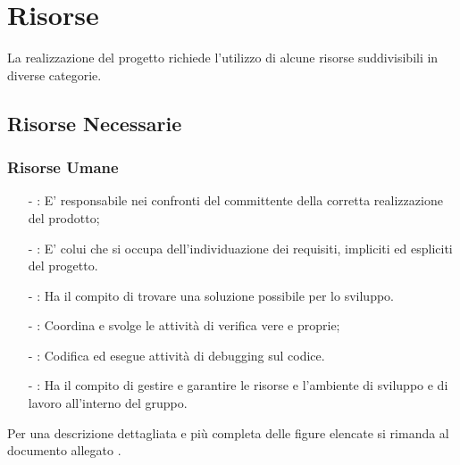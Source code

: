 \section{Risorse} \label{risorse}
La realizzazione del progetto richiede l'utilizzo di alcune risorse suddivisibili in diverse categorie.
\subsection{Risorse Necessarie} 
\subsubsection{Risorse Umane}
\begin{itemize}
	\item[-] \textbf{\ruoloResponsabile}: E' responsabile nei confronti del committente della corretta realizzazione del prodotto;
	\item[-] \textbf{\ruoloAnalista}: E' colui che si occupa dell'individuazione dei requisiti, impliciti ed espliciti del progetto.
	\item[-] \textbf{\ruoloProgettista}: Ha il compito di trovare una soluzione possibile per lo sviluppo.
	\item[-] \textbf{\ruoloVerificatore}: Coordina e svolge le attività di verifica vere e proprie;
	\item[-] \textbf{\ruoloProgrammatore}: Codifica ed esegue attività di debugging sul codice.
	\item[-] \textbf{\ruoloAmministratore}: Ha il compito di gestire e garantire le risorse e l'ambiente di sviluppo e di lavoro all'interno del gruppo.
\end{itemize}
Per una descrizione dettagliata e più completa delle figure elencate si rimanda al documento allegato \PdP .

